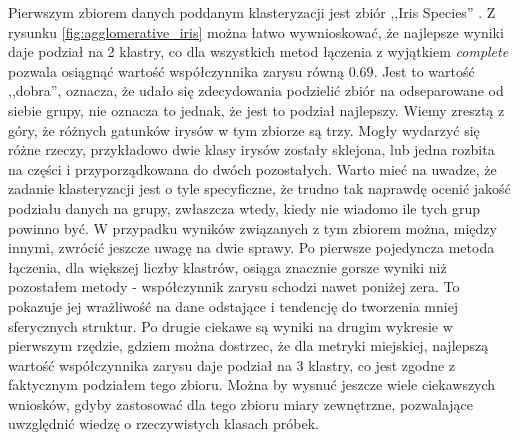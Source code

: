 \documentclass{classrep}
\begin{document}
{{            Pierwszym zbiorem danych poddanym klasteryzacji jest zbiór ,,Iris Species''
            . Z rysunku \ref{fig:agglomerative_iris} można łatwo wywnioskować, że
            najlepsze wyniki daje podział na 2 klastry, co dla wszystkich metod
            łączenia z wyjątkiem \emph{complete} pozwala osiągnąć wartość współczynnika
            zarysu równą $0.69$. Jest to wartość ,,dobra'', oznacza, że udało się
            zdecydowania podzielić zbiór na odseparowane od siebie grupy, nie oznacza
            to jednak, że jest to podział najlepszy. Wiemy zresztą z góry, że różnych
            gatunków irysów w tym zbiorze są trzy. Mogły wydarzyć się różne rzeczy,
            przykładowo dwie klasy irysów zostały sklejona, lub jedna rozbita na części
            i przyporządkowana do dwóch pozostałych. Warto mieć na uwadze, że zadanie
            klasteryzacji jest o tyle specyficzne, że trudno tak naprawdę ocenić jakość
            podziału danych na grupy, zwłaszcza wtedy, kiedy nie wiadomo ile tych grup
            powinno być. W przypadku wyników związanych z tym zbiorem można, między
            innymi, zwrócić jeszcze uwagę na dwie sprawy. Po pierwsze pojedyncza metoda
            łączenia, dla większej liczby klastrów, osiąga znacznie gorsze wyniki niż
            pozostałem metody - współczynnik zarysu schodzi nawet poniżej zera. To
            pokazuje jej wrażliwość na dane odstające i tendencję do tworzenia mniej
            sferycznych struktur. Po drugie ciekawe są wyniki na drugim wykresie w
            pierwszym rzędzie, gdziem można dostrzec, że dla metryki miejskiej,
            najlepszą wartość współczynnika zarysu daje podział na 3 klastry, co jest
            zgodne z faktycznym podziałem tego zbioru. Można by wysnuć jeszcze wiele
            ciekawszych wniosków, gdyby zastosować dla tego zbioru miary zewnętrzne,
            pozwalające uwzględnić wiedzę o rzeczywistych klasach próbek.

}}
\end{document}
